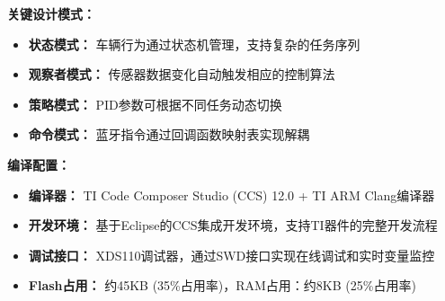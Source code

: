 \documentclass[UTF8]{ctexart}
\begin{document}
\textbf{关键设计模式：}
\begin{itemize}
    \item \textbf{状态模式：} 车辆行为通过状态机管理，支持复杂的任务序列
    \item \textbf{观察者模式：} 传感器数据变化自动触发相应的控制算法
    \item \textbf{策略模式：} PID参数可根据不同任务动态切换
    \item \textbf{命令模式：} 蓝牙指令通过回调函数映射表实现解耦
\end{itemize}

\textbf{编译配置：}
\begin{itemize}
    \item     \textbf{编译器：} TI Code Composer Studio (CCS) 12.0 + TI ARM Clang编译器
    \item \textbf{开发环境：} 基于Eclipse的CCS集成开发环境，支持TI器件的完整开发流程
    \item \textbf{调试接口：} XDS110调试器，通过SWD接口实现在线调试和实时变量监控
    \item \textbf{Flash占用：} 约45KB (35\%占用率)，RAM占用：约8KB (25\%占用率)
\end{itemize}
\end{document}
